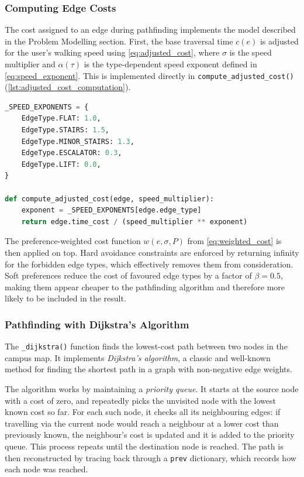 \documentclass[a4paper,10pt]{amsart}
\begin{document}
\subsubsection{Computing Edge Costs}

The cost assigned to an edge during pathfinding implements the model described in the Problem Modelling section.
First, the base traversal time $c(e)$ is adjusted for the user's walking speed using \autoref{eq:adjusted_cost}, where $\sigma$ is the speed multiplier and $\alpha(\tau)$ is the type-dependent speed exponent defined in \autoref{eq:speed_exponent}.
This is implemented directly in \texttt{compute\_adjusted\_cost()} (\autoref{lst:adjusted_cost_computation}).

\begin{lstlisting}[language=python,caption={Speed-adjusted edge cost computation},float=htbp,label={lst:adjusted_cost_computation}]
_SPEED_EXPONENTS = {
    EdgeType.FLAT: 1.0,
    EdgeType.STAIRS: 1.5,
    EdgeType.MINOR_STAIRS: 1.3,
    EdgeType.ESCALATOR: 0.3,
    EdgeType.LIFT: 0.0,
}

def compute_adjusted_cost(edge, speed_multiplier):
    exponent = _SPEED_EXPONENTS[edge.edge_type]
    return edge.time_cost / (speed_multiplier ** exponent)
\end{lstlisting}

The preference-weighted cost function $w(e, \sigma, P)$ from \autoref{eq:weighted_cost} is then applied on top.
Hard avoidance constraints are enforced by returning infinity for the forbidden edge types, which effectively removes them from consideration.
Soft preferences reduce the cost of favoured edge types by a factor of $\beta = 0.5$, making them appear cheaper to the pathfinding algorithm and therefore more likely to be included in the result.

\subsubsection{Pathfinding with Dijkstra's Algorithm}

The \texttt{\_dijkstra()} function finds the lowest-cost path between two nodes in the campus map.
It implements \emph{Dijkstra's algorithm}, a classic and well-known method for finding the shortest path in a graph with non-negative edge weights.

The algorithm works by maintaining a \emph{priority queue}.
It starts at the source node with a cost of zero, and repeatedly picks the unvisited node with the lowest known cost so far.
For each such node, it checks all its neighbouring edges: if travelling via the current node would reach a neighbour at a lower cost than previously known, the neighbour's cost is updated and it is added to the priority queue.
This process repeats until the destination node is reached.
The path is then reconstructed by tracing back through a \texttt{prev} dictionary, which records how each node was reached.
\end{document}
